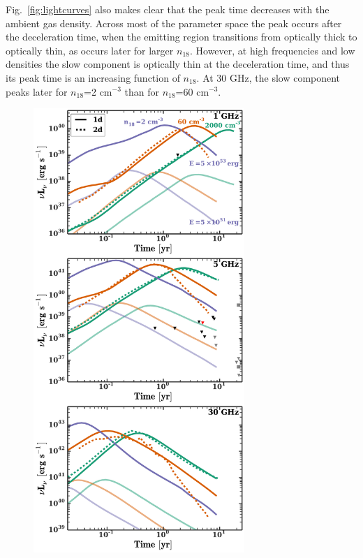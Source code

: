 \documentclass[usenatbib,fleqn]{mnras}
\begin{document}
Fig.~\ref{fig:lightcurves} also makes clear that the peak time
decreases with the ambient gas density.  Across most of the parameter
space the peak occurs after the deceleration time, when the emitting
region transitions from optically thick to optically thin, as occurs
later for larger $n_{18}$. However, at high frequencies and low
densities the slow component is optically thin at the deceleration
time, and thus its peak time is an increasing function of $n_{18}$. At
30 GHz, the slow component peaks later for $n_{18}$=2 cm$^{-3}$ than
for $n_{18}$=60 cm$^{-3}$.


\begin{figure} 
  \includegraphics[width=8cm]{lightcurves.pdf}

\end{figure}
\end{document}
